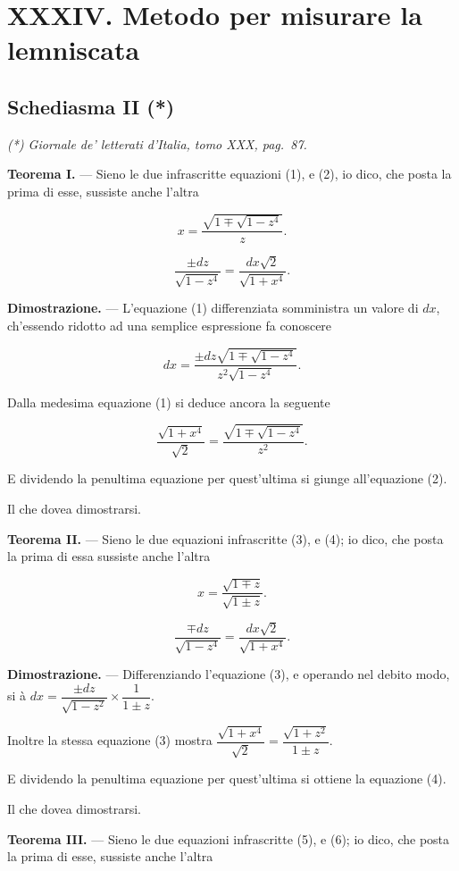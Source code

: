 \documentclass{article}
\begin{document}
\section*{XXXIV. Metodo per misurare la lemniscata}
\subsection*{Schediasma II (*)}
\emph{(*) Giornale de' letterati d'Italia, tomo XXX, pag.~87.}

\textbf{Teorema I.} --- Sieno le due infrascritte equazioni (1), e (2), io dico, che posta la
prima di esse, sussiste anche l'altra

\[ x = \frac{\sqrt{1 \mp \sqrt{1-z^{4}}}}{z}. \tag{1} \]

\[ \frac{\pm dz}{\sqrt{1-z^{4}}} = \frac{dx\sqrt{2}}{\sqrt{1+x^{4}}}. \tag{2} \]

\textbf{Dimostrazione.} --- L'equazione (1) differenziata somministra un valore di $dx$,
ch'essendo ridotto ad una semplice espressione fa conoscere

\[ dx = \frac{\pm dz\sqrt{1 \mp \sqrt{1-z^{4}}}}{z^{2}\sqrt{1-z^{4}}}. \]

Dalla medesima equazione (1) si deduce ancora la seguente

\[ \frac{\sqrt{1+x^{4}}}{\sqrt{2}} = \frac{\sqrt{1 \mp \sqrt{1-z^{4}}}}{z^{2}}. \]

E dividendo la penultima equazione per quest'ultima si giunge all'equazione (2).

Il che dovea dimostrarsi.

\textbf{Teorema II.} --- Sieno le due equazioni infrascritte (3), e (4); io dico, che posta la
prima di essa sussiste anche l'altra

\[ x = \frac{\sqrt{1\mp z}}{\sqrt{1\pm z}}. \tag{3} \]

\[ \frac{\mp dz}{\sqrt{1-z^{4}}} = \frac{dx\sqrt{2}}{\sqrt{1+x^{4}}}. \tag{4} \]

\textbf{Dimostrazione.} --- Differenziando l'equazione (3), e operando nel debito modo, si à
$dx = \dfrac{\pm dz}{\sqrt{1-z^{2}}} \times \dfrac{1}{1\pm z}$.

Inoltre la stessa equazione (3) mostra $\dfrac{\sqrt{1+x^{4}}}{\sqrt{2}} = \dfrac{\sqrt{1+z^{2}}}{1\pm z}$.

E dividendo la penultima equazione per quest'ultima si ottiene la equazione (4).

Il che dovea dimostrarsi.

\textbf{Teorema III.} --- Sieno le due equazioni infrascritte (5), e (6); io dico, che posta la
prima di esse, sussiste anche l'altra
\end{document}
